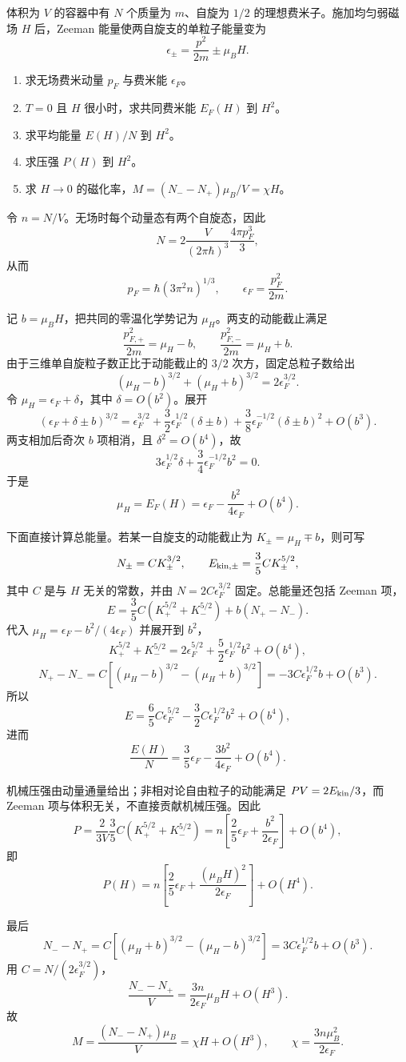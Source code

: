 \begin{question}
体积为 $V$ 的容器中有 $N$ 个质量为 $m$、自旋为 $1/2$ 的理想费米子。施加均匀弱磁场 $H$ 后，Zeeman 能量使两自旋支的单粒子能量变为
\[\epsilon_\pm=\frac{p^2}{2m}\pm\mu_BH.\]
\begin{enumerate}
\item 求无场费米动量 $p_F$ 与费米能 $\epsilon_F$。
\item $T=0$ 且 $H$ 很小时，求共同费米能 $E_F(H)$ 到 $H^2$。
\item 求平均能量 $E(H)/N$ 到 $H^2$。
\item 求压强 $P(H)$ 到 $H^2$。
\item 求 $H\to0$ 的磁化率，$M=(N_--N_+)\mu_B/V=\chi H$。
\end{enumerate}
\begin{solution}
令 $n=N/V$。无场时每个动量态有两个自旋态，因此
\[
N=2\frac{V}{(2\pi\hbar)^3}\frac{4\pi p_F^3}{3},
\]
从而
\[
\boxed{p_F=\hbar(3\pi^2n)^{1/3}},\qquad
\boxed{\epsilon_F=\frac{p_F^2}{2m}}.
\]

记 $b=\mu_BH$，把共同的零温化学势记为 $\mu_H$。两支的动能截止满足
\[
\frac{p_{F,+}^2}{2m}=\mu_H-b,\qquad
\frac{p_{F,-}^2}{2m}=\mu_H+b.
\]
由于三维单自旋粒子数正比于动能截止的 $3/2$ 次方，固定总粒子数给出
\[
(\mu_H-b)^{3/2}+(\mu_H+b)^{3/2}=2\epsilon_F^{3/2}.
\]
令 $\mu_H=\epsilon_F+\delta$，其中 $\delta=O(b^2)$。展开
\[
(\epsilon_F+\delta\pm b)^{3/2}
=\epsilon_F^{3/2}
+\frac32\epsilon_F^{1/2}(\delta\pm b)
+\frac38\epsilon_F^{-1/2}(\delta\pm b)^2+O(b^3).
\]
两支相加后奇次 $b$ 项相消，且 $\delta^2=O(b^4)$，故
\[
3\epsilon_F^{1/2}\delta+\frac34\epsilon_F^{-1/2}b^2=0.
\]
于是
\[
\boxed{\mu_H=E_F(H)=\epsilon_F-\frac{b^2}{4\epsilon_F}+O(b^4)}.
\]

下面直接计算总能量。若某一自旋支的动能截止为 $K_\pm=\mu_H\mp b$，则可写
\[
N_\pm=C K_\pm^{3/2},\qquad
E_{{\rm kin},\pm}=\frac35 C K_\pm^{5/2},
\]
其中 $C$ 是与 $H$ 无关的常数，并由 $N=2C\epsilon_F^{3/2}$ 固定。总能量还包括 Zeeman 项，
\[
E=\frac35C(K_+^{5/2}+K_-^{5/2})+b(N_+-N_-).
\]
代入 $\mu_H=\epsilon_F-b^2/(4\epsilon_F)$ 并展开到 $b^2$，
\[
K_+^{5/2}+K_-^{5/2}
=2\epsilon_F^{5/2}+\frac52\epsilon_F^{1/2}b^2+O(b^4),
\]
\[
N_+-N_-
=C[(\mu_H-b)^{3/2}-(\mu_H+b)^{3/2}]
=-3C\epsilon_F^{1/2}b+O(b^3).
\]
所以
\[
E=\frac65C\epsilon_F^{5/2}-\frac32C\epsilon_F^{1/2}b^2+O(b^4),
\]
进而
\[
\boxed{\frac{E(H)}{N}
=\frac35\epsilon_F-\frac{3b^2}{4\epsilon_F}+O(b^4)}.
\]

机械压强由动量通量给出；非相对论自由粒子的动能满足 $PV=2E_{\rm kin}/3$，而 Zeeman 项与体积无关，不直接贡献机械压强。因此
\[
P=\frac{2}{3V}\frac35C(K_+^{5/2}+K_-^{5/2})
=n\left[\frac25\epsilon_F+\frac{b^2}{2\epsilon_F}\right]+O(b^4),
\]
即
\[
\boxed{P(H)=n\left[\frac25\epsilon_F+
\frac{(\mu_BH)^2}{2\epsilon_F}\right]+O(H^4)}.
\]

最后
\[
N_--N_+
=C[(\mu_H+b)^{3/2}-(\mu_H-b)^{3/2}]
=3C\epsilon_F^{1/2}b+O(b^3).
\]
用 $C=N/(2\epsilon_F^{3/2})$，
\[
\frac{N_--N_+}{V}=\frac{3n}{2\epsilon_F}\mu_BH+O(H^3).
\]
故
\[
M=\frac{(N_--N_+)\mu_B}{V}=\chi H+O(H^3),\qquad
\boxed{\chi=\frac{3n\mu_B^2}{2\epsilon_F}}.
\]
\end{solution}
\end{question}

